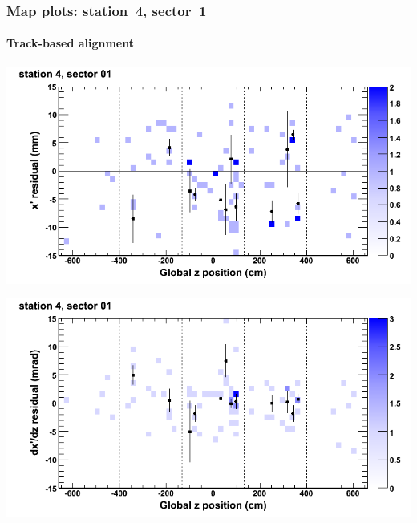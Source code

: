\documentclass[compress]{beamer}
\begin{document}
\begin{frame}
\frametitle{Map plots: station~4, sector~1}
\framesubtitle{Track-based alignment}
\includegraphics[width=0.5\linewidth]{mapplots_re05/DTvsz_st4sec01_x.png}

\includegraphics[width=0.5\linewidth]{mapplots_re05/DTvsz_st4sec01_dxdz.png}
\end{frame}
\end{document}
